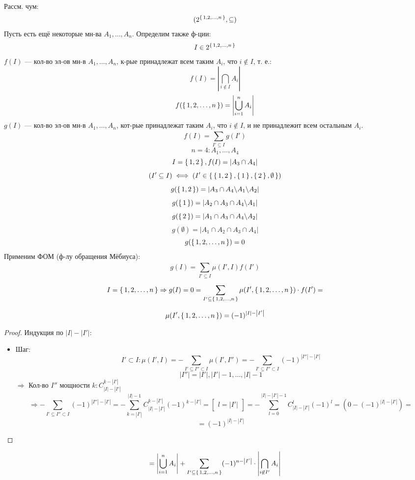 \begin{example}
Рассм. чум:
\[
  (2^{\set{1, 2, \ldots, n}}, \subseteq)
\]
Пусть есть ещё некоторые мн-ва $A_1, \ldots, A_n$. Определим также ф-ции:
\[
I \in 2^{\set{1, 2, \ldots, n}}
\]
$f(I)$ --- кол-во эл-ов мн-в $A_1, \ldots, A_n$, к-рые принадлежат всем таким $A_i$, что $i \not\in I$, т. е.:
\[
f(I) = \left|\bigcap_{i \not\in I}^{} A_i\right|
\]
\[
f(\set{1, 2, \ldots, n}) = \left|\bigcup_{i = 1}^{n} A_i\right|
\]  
$g(I)$ --- кол-во эл-ов мн-в $A_1, \ldots,A_n$, кот-рые принадлежат таким $A_i$, что $i \not \in I$, и не принадлежит всем остальным $A_i$.
\[
f(I) = \sum_{I' \subseteq I}^{} g(I')
\]
\[
n = 4 \colon A_1, \ldots, A_4
\]
\[
  I = \set{1, 2}, f(I) = \left|A_3 \cap A_4\right|
\]
\[
  (I' \subseteq I) \iff (I' \in \set{\set{1, 2}, \set{1}, \set{2}, \emptyset})
\]
\[
g(\set{1, 2}) = \left|A_3 \cap A_4 \backslash A_1 \backslash A_2\right|
\]
\[
g(\set{1}) = \left|A_2 \cap A_3 \cap A_4 \backslash A_1\right|
\]
\[
g(\set{2}) = \left|A_1 \cap A_3 \cap A_4 \backslash A_2\right|
\]
\[
g(\emptyset) = \left|A_1 \cap A_2 \cap A_3 \cap A_4\right|
\]
\[
g(\set{1, 2, \ldots, n}) = 0
\]
Применим ФОМ (ф-лу обращения Мёбиуса):
\[
g(I) = \sum_{I' \subseteq I}^{} \mu(I', I) f(I')
\]
\[
I = \set{1, 2, \ldots, n} \Rightarrow g(I) = 0 = \sum_{I' \subseteq \set{1, 2, \ldots, n}}^{} \mu(I', \set{1, 2, \ldots, n}) \cdot f(I') =
\]
\begin{lemma}
  \[
  \mu(I', \set{1, 2, \ldots, n}) = (-1)^{\left|I\right| - \left|I'\right|}
  \]
\end{lemma}
\begin{proof}
   Индукция по $\left|I\right| - \left|I'\right|$:
   \begin{itemize}
     \item Шаг:
       \[
         I' \subset I \colon \mu(I', I) = -\sum_{I' \subseteq I'' \subset I}^{} \mu(I', I'') = -\sum_{I' \subseteq I'' \subset I}^{} (-1)^{\left|I''\right| - \left|I'\right|}
       \]
       \[
         \left|I''\right| = \left|I'\right|, \left|I'\right| - 1, \ldots, \left|I\right| - 1
       \]
       $\Rightarrow$ Кол-во $I''$ мощности $k \colon C_{\left|I\right| - \left|I'\right|}^{k - \left|I'\right|}$
       \[
       \Rightarrow  -\sum_{I' \subseteq I'' \subset I}^{} (-1)^{\left|I''\right| - \left|I'\right|} = -\sum_{k = \left|I'\right|}^{\left|I\right| - 1} C_{\left|I\right| - \left|I'\right|}^{k - \left|I'\right|} (-1)^{k - \left|I'\right|} = \begin{bmatrix} l = \left|I'\right| \end{bmatrix} = -\sum_{l = 0}^{\left|I\right| - \left|I'\right| - 1} C_{\left|I\right| - \left|I'\right|}^{l}(-1)^{l} = (0 - (-1)^{\left|I\right| - \left|I'\right|}) = 
       \]
       \[
       = (-1)^{\left|I\right| - \left|I'\right|}
       \]
   \end{itemize}
\end{proof}
\[
 = \left|\bigcup_{i = 1}^{n} A_i\right| + \sum_{I' \subseteq \set{1, 2, \ldots, n}}^{} (-1)^{n - \left|I'\right|} \cdot \left|\bigcap_{i \not\in I'}^{} A_i\right|
\]
\end{example}
